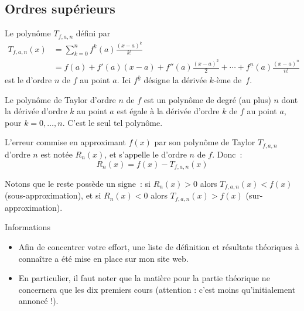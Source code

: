\subsection{Ordres supérieurs}
\begin{frame}%
\begin{definition}
Le polynôme \(T_{f,a,n}\) défini par\pause{}
\begin{align*}
T_{f,a,n}(x) &=\sum_{k=0}^n f^{\underline{k}}(a) \frac{(x-a)^k}{k!}\\
&=f(a) + f'(a)(x-a) + f''(a) \frac{(x-a)^2}{2} + \cdots + f^{\underline{n}}(a) \frac{(x-a)^n}{n!}
\end{align*}
est le  d'ordre $n$ de $f$ au point $a$.\pause{} Ici $f^{\underline{k}}$ désigne la dérivée $k$-ème de~$f$.
\end{definition}\pause{}

\begin{remark*}%
Le polynôme de Taylor d'ordre $n$ de $f$ est un polynôme de degré (au plus) $n$ dont la dérivée d'ordre $k$ au point $a$ est égale à la dérivée d'ordre \(k\) de $f$ au point $a$, pour $k = 0, \ldots, n$.\pause{} C'est le seul tel polynôme.
\end{remark*}
\end{frame}
\begin{frame}
  \begin{definition}
    L'erreur commise en approximant $f(x)$ par son polynôme de Taylor \(T_{f,a,n}\) d'ordre $n$ est notée $R_n(x)$, et s'appelle le  d'ordre $n$ de $f$. Donc~:
    \begin{equation*}
      R_n(x) = f(x)-T_{f,a,n}(x)
    \end{equation*}
  \end{definition}

  \begin{remark*}
    Notons que le reste possède un signe~: si $R_n(x) > 0$ alors $T_{f,a,n}(x) < f(x)$ (sous-approximation), et si $R_n(x) < 0$ alors $T_{f,a,n}(x) > f(x)$ (sur-approximation).
  \end{remark*}
\end{frame}
\begin{frame}{Informations}
  \pause
  \begin{itemize}
  \item Afin de concentrer votre effort, une liste de définition et résultats théoriques à connaître a été mise en place sur mon site web.\pause{}
  \item En particulier, il faut noter que la matière pour la partie théorique ne concernera que les dix premiers cours (attention : c'est moins qu'initialement annoncé !).
  \end{itemize}
\end{frame}

